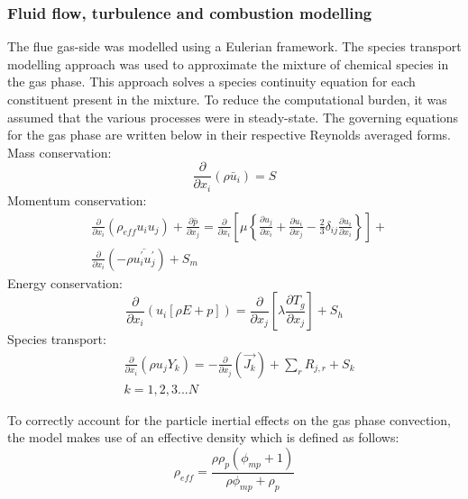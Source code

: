 \documentclass[twocolumn,10pt]{asme2ej}
\begin{document}
\subsubsection{Fluid flow, turbulence and combustion modelling}
The flue gas-side was modelled using a Eulerian framework. The species transport modelling approach was used to approximate the mixture of chemical species in the gas phase. This approach solves a species continuity equation for each constituent present in the mixture. To reduce the computational burden, it was assumed that the various processes were in steady-state. The governing equations for the gas phase are written below in their respective Reynolds averaged forms.
Mass conservation:
\begin{equation}\label{eqn_RANS_mass}
\frac{\partial}{\partial x_{i}}(\rho \bar{u}_{i})=S
\end{equation}
Momentum conservation:
\begin{equation}\label{eqn_momentum}
\begin{split}
&\frac{\partial}{\partial x_{i}}(\rho_{eff} u_{i}u_{j})+\frac{\partial \overline{p}}{\partial x_{j}}=\frac{\partial}{\partial x_{i}}\left[\mu\left\{\frac{\partial u_{j}}{\partial x_{i}}+\frac{\partial u_{i}}{\partial x_{j}}-\frac{2}{3}\delta_{ij}\frac{\partial u_{i}}{\partial x_{i}}\right\}\right]+\\
&\frac{\partial}{\partial x_{i}}(-\rho\overline{u_{i}^{'}u_{j}^{'}})+S_m
\end{split}
\end{equation}
Energy conservation:
\begin{equation}\label{eqn_energy}
\frac{\partial }{\partial x_{i}} (u_{i}[\rho E+p])=\frac{\partial }{\partial x_{j}}\left[\lambda\frac{\partial T_{g}}{\partial x_{j}}\right] +S_{h}
\end{equation}
Species transport:
\begin{equation}\label{eqn_species}
\begin{split}
&\frac{\partial}{\partial x_{i}}(\rho u_{j}Y_{k})=-\frac{\partial}{\partial x_{j}}(\vec{J_{k}})+ \sum_r R_{j,r} + S_{k}\\
&k = 1,2,3...N
\end{split}
\end{equation}

To correctly account for the particle inertial effects on the gas phase convection, the model makes use of an effective density which is defined as follows:
\begin{equation} \label{eqn_eff_rho}
	\rho_{eff} = \frac{\rho \rho_p \left( \phi_{mp} + 1 \right)}{\rho \phi_{mp} + \rho_p}
\end{equation}
\end{document}
